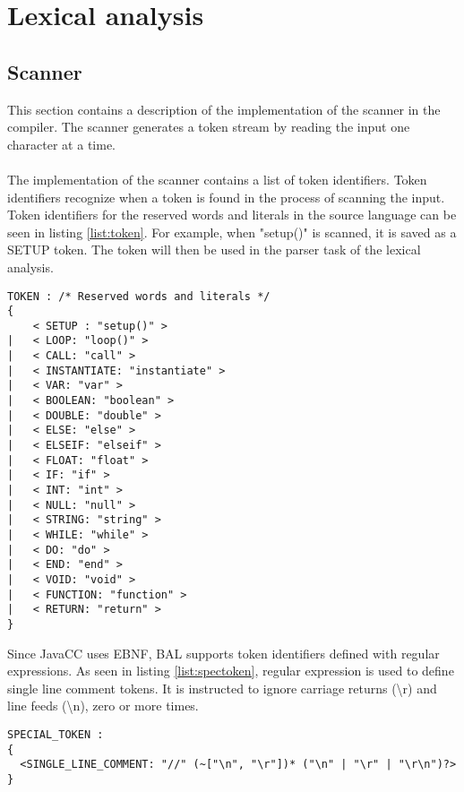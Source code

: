 \section{Lexical analysis}
\subsection{Scanner}
This section contains a description of the implementation of the scanner in the compiler. The scanner generates a token stream by reading the input one character at a time.\\
\\The implementation of the scanner contains a list of token identifiers. Token identifiers recognize when a token is found in the process of scanning the input. Token identifiers for the reserved words and literals in the source language can be seen in listing \ref{list:token}. For example, when "setup()" is scanned, it is saved as a SETUP token. The token will then be used in the parser task of the lexical analysis. 

\begin{lstlisting}[caption=Token identifiers for reserved words and literals, label=list:token]
TOKEN : /* Reserved words and literals */
{
	< SETUP : "setup()" >
|	< LOOP: "loop()" >	
|	< CALL: "call" >
|	< INSTANTIATE: "instantiate" >
|	< VAR: "var" >
|	< BOOLEAN: "boolean" >
|	< DOUBLE: "double" >
|	< ELSE: "else" >
|	< ELSEIF: "elseif" >
|	< FLOAT: "float" >
|	< IF: "if" >
|	< INT: "int" >
|	< NULL: "null" >
|	< STRING: "string" >
|	< WHILE: "while" >
| 	< DO: "do" >
| 	< END: "end" >
|   < VOID: "void" >
|   < FUNCTION: "function" >
|   < RETURN: "return" >
}

\end{lstlisting}
Since JavaCC uses EBNF, BAL supports token identifiers defined with regular expressions. As seen in listing \ref{list:spectoken}, regular expression is used to define single line comment tokens. It is instructed to ignore carriage returns (\textbackslash{r}) and line feeds (\textbackslash{n}), zero or more times. 

\begin{lstlisting}[caption=Special token for single line comment, label=list:spectoken]
SPECIAL_TOKEN :
{
  <SINGLE_LINE_COMMENT: "//" (~["\n", "\r"])* ("\n" | "\r" | "\r\n")?>
}
\end{lstlisting}


 

